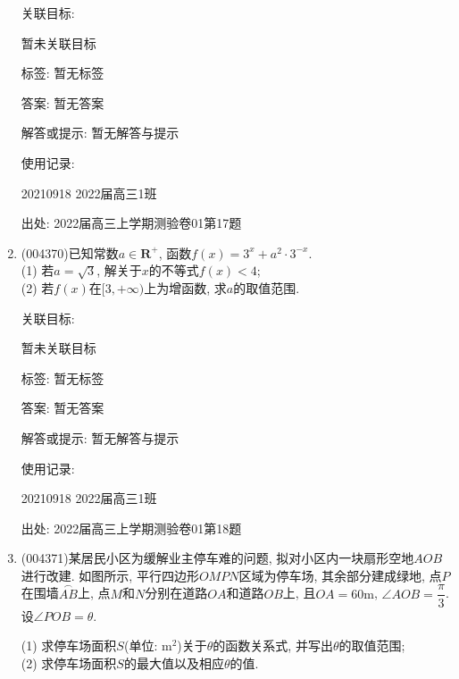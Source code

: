 \documentclass[10pt,a4paper]{article}
\begin{document}
\begin{enumerate}[1.]
关联目标:

暂未关联目标



标签: 暂无标签

答案: 暂无答案

解答或提示: 暂无解答与提示

使用记录:

20210918	2022届高三1班		


出处: 2022届高三上学期测验卷01第17题
\item { (004370)}已知常数$a\in \mathbf{R}^+$, 函数$f(x)=3^x+a^2\cdot 3^{-x}$.\\
(1) 若$a=\sqrt 3$, 解关于$x$的不等式$f(x)<4$;\\
(2) 若$f(x)$在$[3,+\infty)$上为增函数, 求$a$的取值范围.


关联目标:

暂未关联目标



标签: 暂无标签

答案: 暂无答案

解答或提示: 暂无解答与提示

使用记录:

20210918	2022届高三1班		


出处: 2022届高三上学期测验卷01第18题
\item { (004371)}某居民小区为缓解业主停车难的问题, 拟对小区内一块扇形空地$AOB$进行改建. 如图所示, 平行四边形$OMPN$区域为停车场, 其余部分建成绿地, 点$P$在围墙$\overset\frown{AB}$上, 点$M$和$N$分别在道路$OA$和道路$OB$上, 且$OA=60\text{m}$, $\angle AOB=\dfrac\pi 3$. 设$\angle POB=\theta$.
\begin{center}
\end{center}
(1) 求停车场面积$S$(单位: $\text{m}^2$)关于$\theta$的函数关系式, 并写出$\theta$的取值范围;\\
(2) 求停车场面积$S$的最大值以及相应$\theta$的值.



\end{enumerate}
\end{document}
